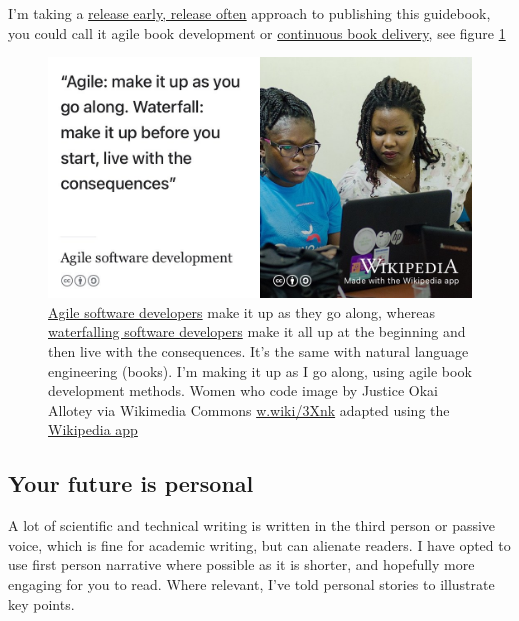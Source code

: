 \documentclass[
]{book}
\begin{document}
I'm taking a \href{https://en.wikipedia.org/wiki/Release_early,_release_often}{release early, release often} \citep{Raymond1999} approach to publishing this guidebook, you could call it agile book development or \href{https://en.wikipedia.org/wiki/Continuous_delivery}{continuous book delivery}, see figure \ref{fig:agile-vs-waterfall-fig} \citep{realagile}

\begin{figure}

{\centering \includegraphics[width=1\linewidth]{images/agile-vs-waterfall} 

}

\caption{\href{https://en.wikipedia.org/wiki/Agile_software_development}{Agile software developers} make it up as they go along, whereas \href{https://en.wikipedia.org/wiki/Waterfall_model}{waterfalling software developers} make it all up at the beginning and then live with the consequences. It's the same with natural language engineering (books). I'm making it up as I go along, using agile book development methods. Women who code image by Justice Okai Allotey via Wikimedia Commons \href{https://w.wiki/3Xnk}{w.wiki/3Xnk} adapted using the \href{https://apps.apple.com/us/app/wikipedia/id324715238}{Wikipedia app}}\label{fig:agile-vs-waterfall-fig}
\end{figure}



\hypertarget{firstperson}{%
\subsection{Your future is personal}\label{firstperson}}

A lot of scientific and technical writing is written in the third person or passive voice, which is fine for academic writing, but can alienate readers. I have opted to use first person narrative where possible as it is shorter, and hopefully more engaging for you to read. \citep{googler} Where relevant, I've told personal stories to illustrate key points.
\end{document}
